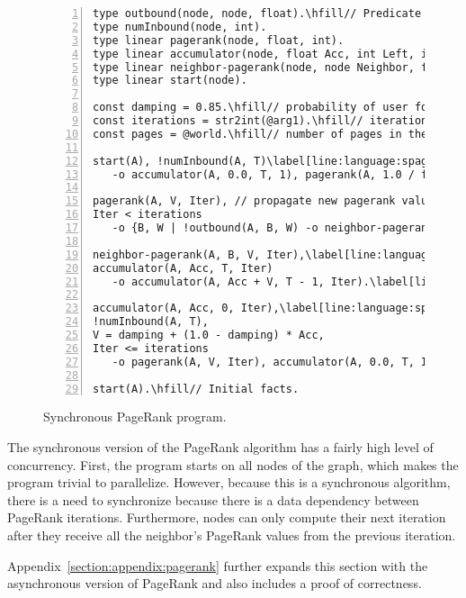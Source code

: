 \begin{figure}[h!]
\begin{Verbatim}[numbers=left,fontsize=\codesize,commandchars=\\\[\]]
type outbound(node, node, float).\hfill// Predicate declaration.
type numInbound(node, int).
type linear pagerank(node, float, int).
type linear accumulator(node, float Acc, int Left, int Iteration).
type linear neighbor-pagerank(node, node Neighbor, float Rank, int Iteration).
type linear start(node).

const damping = 0.85.\hfill// probability of user following a link in the current page.\label[line:language:spagerank_const1]
const iterations = str2int(@arg1).\hfill// iterations to compute.
const pages = @world.\hfill// number of pages in the graph.\label[line:language:spagerank_const2]

start(A), !numInbound(A, T)\label[line:language:spagerank_first1]\hfill// Rule 1: initialize pagerank and accumulator.
   -o accumulator(A, 0.0, T, 1), pagerank(A, 1.0 / float(pages), 0).\label[line:language:spagerank_first2]

pagerank(A, V, Iter), // propagate new pagerank value\label[line:language:spagerank_second1]\hfill// Rule 2: propagate pagerank.
Iter < iterations
   -o {B, W | !outbound(A, B, W) -o neighbor-pagerank(B, A, V * W, Iter + 1)}.\label[line:language:spagerank_second2]

neighbor-pagerank(A, B, V, Iter),\label[line:language:spagerank_fourth1]\hfill// Rule 3: accumulate neighbor's value.
accumulator(A, Acc, T, Iter)
   -o accumulator(A, Acc + V, T - 1, Iter).\label[line:language:spagerank_fourth2]

accumulator(A, Acc, 0, Iter),\label[line:language:spagerank_third1]\hfill// Rule 4: generate new pagerank.
!numInbound(A, T),
V = damping + (1.0 - damping) * Acc,
Iter <= iterations
   -o pagerank(A, V, Iter), accumulator(A, 0.0, T, Iter + 1).\label[line:language:spagerank_third2]
	
start(A).\hfill// Initial facts.
\end{Verbatim}
\caption{Synchronous PageRank program.}
\label{language:code:pagerank}
\end{figure}

The synchronous version of the PageRank algorithm has a fairly high level of
concurrency. First, the program starts on all nodes of the graph, which makes
the program trivial to parallelize. However, because this is a synchronous
algorithm, there is a need to synchronize because there is a data dependency
between PageRank iterations. Furthermore, nodes can only compute their next
iteration after they receive all the neighbor's PageRank values from the
previous iteration.

Appendix~\ref{section:appendix:pagerank} further expands this section with the
asynchronous version of PageRank and also includes a proof of correctness.
